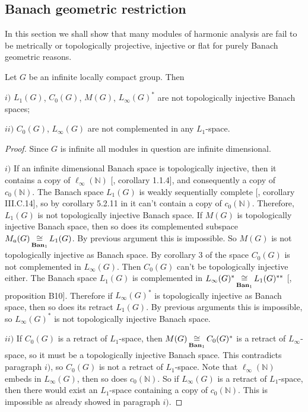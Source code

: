 
\subsection{Banach geometric restriction}
\label{SubSectionBanachGeometricRestriction}

In this section we shall show that many modules of harmonic analysis are fail to be metrically or topologically projective, injective or flat for purely Banach geometric reasons. 

\begin{proposition}\label{StdModAreNotRetrOfL1LInf} Let $G$ be an infinite locally compact group. Then

$i)$ $L_1(G)$, $C_0(G)$, $M(G)$, $L_\infty(G)^*$ are not topologically injective Banach spaces;

$ii)$ $C_0(G)$, $L_\infty(G)$ are not complemented in any $L_1$-space.
\end{proposition}
\begin{proof}
Since $G$ is infinite all modules in question are infinite dimensional.

$i)$ If an infinite dimensional Banach space is topologically injective, then it contains a copy of $\ell_\infty(\mathbb{N})$ [\cite{RosOnRelDisjFamOfMeas}, corollary 1.1.4], and consequently a copy of $c_0(\mathbb{N})$. The Banach space $L_1(G)$ is weakly sequentially complete [\cite{WojBanSpForAnalysts}, corollary III.C.14], so by corollary 5.2.11 in \cite{KalAlbTopicsBanSpTh} it can't contain a copy of $c_0(\mathbb{N})$. Therefore, $L_1(G)$ is not topologically injective Banach space.  If $M(G)$ is topologically injective Banach space, then so does its complemented subspace $M_a(G)\mathop{\mathbin{\cong}}\limits_{\mathbf{Ban}_1}L_1(G)$. By previous argument this is impossible. So $M(G)$ is not topologically injective as Banach space. By corollary 3 of \cite{LauMingComplSubspInLInfOfG} the space $C_0(G)$ is not complemented in $L_\infty(G)$. Then $C_0(G)$ can't be topologically injective either. The Banach space $L_1(G)$ is complemented in $L_\infty(G)^*\mathop{\mathbin{\cong}}\limits_{\mathbf{Ban}_1}L_1(G)^{**}$ [\cite{DefFloTensNorOpId}, proposition  B10]. Therefore if $L_\infty(G)^*$ is topologically injective as Banach space, then so does its retract $L_1(G)$. By previous arguments this is impossible, so $L_\infty(G)^*$ is not topologically injective Banach space.

$ii)$ If $C_0(G)$ is a retract of $L_1$-space, then $M(G)\mathop{\mathbin{\cong}}\limits_{\mathbf{Ban}_1}C_0(G)^*$ is a retract of $L_\infty$-space, so it must be a topologically injective Banach space. This contradicts paragraph $i)$, so $C_0(G)$ is not a retract of $L_1$-space. Note that $\ell_\infty(\mathbb{N})$ embeds in $L_\infty(G)$, then so does $c_0(\mathbb{N})$. So if $L_\infty(G)$ is a retract of $L_1$-space, then there would exist an $L_1$-space containing a copy of $c_0(\mathbb{N})$. This is impossible as already showed in paragraph $i)$.
\end{proof}

